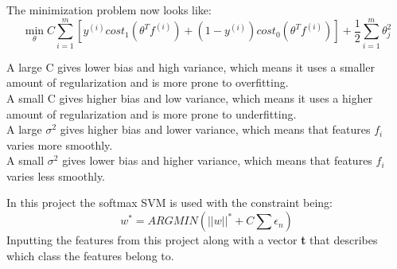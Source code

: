 The minimization problem now looks like:
\begin{equation}
\min_{\theta}C \sum_{i=1}^{m}
\left[ y^{(i)}cost_1(\theta^Tf^{(i)})+(1-y^{(i)})cost_0(\theta^Tf^{(i)}) \right]
+ \frac{1}{2}\sum_{i=1}^{m}\theta^2_j
\end{equation}

A large C gives lower bias and high variance, which means it uses a smaller amount of regularization and is more prone to overfitting. \\
A small C gives higher bias and low variance, which means it uses a higher amount of regularization and is more prone to underfitting. \\
A large $\sigma^2$ gives higher bias and lower variance, which means that features $f_i$ varies more smoothly. \\
A small $\sigma^2$ gives lower bias and higher variance, which means that features $f_i$ varies less smoothly.

In this project the softmax SVM is used with the constraint being:
\begin{equation}
w^* = ARG MIN (||w||^* + C \sum \epsilon_n)
\end{equation}
Inputting the features from this project along with a vector \textbf{t} that describes which class the features belong to.



